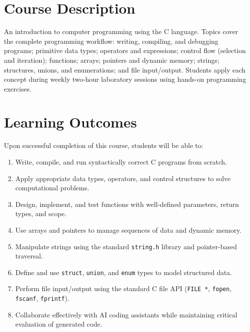 \documentclass[11pt,a4paper]{article}
\begin{document}
\section{Course Description}

An introduction to computer programming using the C language.
Topics cover the complete programming workflow: writing, compiling, and debugging
programs; primitive data types; operators and expressions; control flow (selection
and iteration); functions; arrays; pointers and dynamic memory; strings;
structures, unions, and enumerations; and file input/output.
Students apply each concept during weekly two-hour laboratory sessions using
hands-on programming exercises.

\section{Learning Outcomes}

Upon successful completion of this course, students will be able to:

\begin{enumerate}[leftmargin=*, nosep, label=\textbf{LO\arabic*.}]
  \item Write, compile, and run syntactically correct C programs from scratch.
  \item Apply appropriate data types, operators, and control structures to solve
        computational problems.
  \item Design, implement, and test functions with well-defined parameters,
        return types, and scope.
  \item Use arrays and pointers to manage sequences of data and dynamic memory.
  \item Manipulate strings using the standard \texttt{string.h} library and
        pointer-based traversal.
  \item Define and use \texttt{struct}, \texttt{union}, and \texttt{enum} types
        to model structured data.
  \item Perform file input/output using the standard C file API
        (\texttt{FILE *}, \texttt{fopen}, \texttt{fscanf}, \texttt{fprintf}).
  \item Collaborate effectively with AI coding assistants while maintaining
        critical evaluation of generated code.
\end{enumerate}
\end{document}

